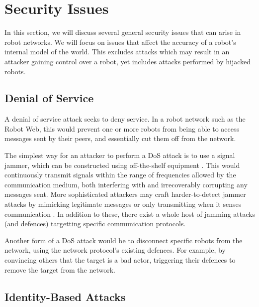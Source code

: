 \section{Security Issues}
In this section, we will discuss several general security issues that can arise in robot networks. We will focus on issues that affect the accuracy of a robot's internal model of the world. This excludes attacks which may result in an attacker gaining control over a robot, yet includes attacks performed by hijacked robots.

\subsection{Denial of Service} %
A denial of service attack seeks to deny service. In a robot network such as the Robot Web, this would prevent one or more robots from being able to access messages sent by their peers, and essentially cut them off from the network.

The simplest way for an attacker to perform a DoS attack is to use a signal jammer, which can be constructed using off-the-shelf equipment \cite{SignalJamming}. This would continuously transmit signals within the range of frequencies allowed by the communication medium, both interfering with and irrecoverably corrupting any messages sent. More sophisticated attackers may craft harder-to-detect jammer attacks by mimicking legitimate messages or only transmitting when it senses communication \cite{SignalJamming}. In addition to these, there exist a whole host of jamming attacks (and defences) targetting specific communication protocols.

Another form of a DoS attack would be to disconnect specific robots from the network, using the network protocol's existing defences. For example, by convincing others that the target is a bad actor, triggering their defences to remove the target from the network. %

\subsection{Identity-Based Attacks}

